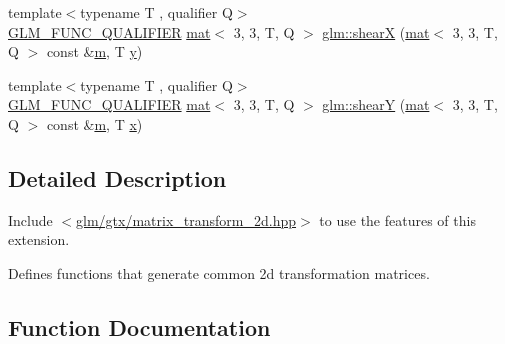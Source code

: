 \begin{DoxyCompactItemize}
\item 
{\footnotesize template$<$typename T , qualifier Q$>$ }\\\mbox{\hyperlink{setup_8hpp_a33fdea6f91c5f834105f7415e2a64407}{G\+L\+M\+\_\+\+F\+U\+N\+C\+\_\+\+Q\+U\+A\+L\+I\+F\+I\+ER}} \mbox{\hyperlink{structglm_1_1mat}{mat}}$<$ 3, 3, T, Q $>$ \mbox{\hyperlink{group__gtx__matrix__transform__2d_gab0c6659f6895e2536aed6c893d70aa74}{glm\+::shearX}} (\mbox{\hyperlink{structglm_1_1mat}{mat}}$<$ 3, 3, T, Q $>$ const \&\mbox{\hyperlink{_s_d_l__opengl__glext_8h_af593500c283bf1a787a6f947f503a5c2}{m}}, T \mbox{\hyperlink{_s_d_l__opengl_8h_a1675d9d7bb68e1657ff028643b4037e3}{y}})
\item 
{\footnotesize template$<$typename T , qualifier Q$>$ }\\\mbox{\hyperlink{setup_8hpp_a33fdea6f91c5f834105f7415e2a64407}{G\+L\+M\+\_\+\+F\+U\+N\+C\+\_\+\+Q\+U\+A\+L\+I\+F\+I\+ER}} \mbox{\hyperlink{structglm_1_1mat}{mat}}$<$ 3, 3, T, Q $>$ \mbox{\hyperlink{group__gtx__matrix__transform__2d_ga2587e46b06a9801aba9ded45cc73445b}{glm\+::shearY}} (\mbox{\hyperlink{structglm_1_1mat}{mat}}$<$ 3, 3, T, Q $>$ const \&\mbox{\hyperlink{_s_d_l__opengl__glext_8h_af593500c283bf1a787a6f947f503a5c2}{m}}, T \mbox{\hyperlink{_s_d_l__opengl_8h_ad0e63d0edcdbd3d79554076bf309fd47}{x}})
\end{DoxyCompactItemize}


\subsection{Detailed Description}
Include $<$\mbox{\hyperlink{matrix__transform__2d_8hpp}{glm/gtx/matrix\+\_\+transform\+\_\+2d.\+hpp}}$>$ to use the features of this extension.

Defines functions that generate common 2d transformation matrices. 

\subsection{Function Documentation}
\mbox{\label{group__gtx__matrix__transform__2d_gaddca86444c3dee30a0aa07673d68743d}} 
